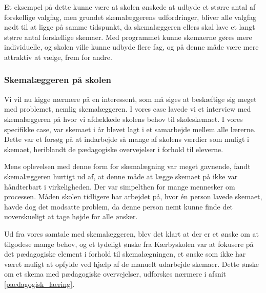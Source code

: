 Et eksempel på dette kunne være at skolen ønskede at udbyde et større antal af forskellige valgfag, men grundet skemalæggerens udfordringer, bliver alle valgfag nødt til at ligge på samme tidspunkt, da skemalæggeren ellers skal lave et langt større antal forskellige skemaer. Med programmet kunne skemaerne gøres mere individuelle, og skolen ville kunne udbyde flere fag, og på denne måde være mere attraktiv at vælge, frem for andre.

\subsubsection{Skemalæggeren på skolen}
Vi vil nu kigge nærmere på en interessent, som må siges at beskæftige sig meget med problemet, nemlig skemalæggeren. I vores case lavede vi et interview med skemalæggeren på \school hvor vi afdækkede skolens behov til skoleskemaet. I vores specifikke case, var skemaet i år blevet lagt i et samarbejde mellem alle lærerne. Dette var et forsøg på at indarbejde så mange af skolens værdier som muligt i skemaet, heriblandt de pædagogiske overvejelser i forhold til eleverne.

Mens oplevelsen med denne form for skemalægning var meget gavnende, fandt skemalæggeren hurtigt ud af, at denne måde at lægge skemaet på ikke var håndterbart i virkeligheden. Der var simpelthen for mange mennesker om processen. Måden skolen tidligere har arbejdet på, hvor \'en person lavede skemaet, havde dog det modsatte problem, da denne person nemt kunne finde det uoverskueligt at tage højde for alle ønsker.

Ud fra vores samtale med skemalæggeren, blev det klart at der er et ønske om at tilgodese mange behov, og et tydeligt ønske fra Kærbyskolen var at fokusere på det pædagogiske element i forhold til skemalægningen, et ønske som ikke har været muligt at opfylde ved hjælp af de manuelt udarbejde skemaer. Dette ønske om et skema med pædagogiske overvejelser, udforskes nærmere i afsnit \ref{paedagogisk_laering}.

